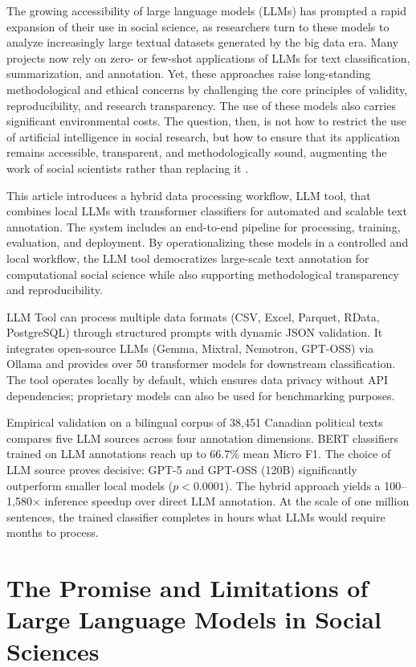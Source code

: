 \documentclass[12pt]{article}
\begin{document}
The growing accessibility of large language models (LLMs) has prompted a rapid expansion of their use in social science, as researchers turn to these models to analyze increasingly large textual datasets generated by the big data era. Many projects now rely on zero- or few-shot applications of LLMs for text classification, summarization, and annotation. Yet, these approaches raise long-standing methodological and ethical concerns by challenging the core principles of validity, reproducibility, and research transparency. The use of these models also carries significant environmental costs. The question, then, is not how to restrict the use of artificial intelligence in social research, but how to ensure that its application remains accessible, transparent, and methodologically sound, augmenting the work of social scientists rather than replacing it \parencite{grimmer_stewart13, do_etal24}.

This article introduces a hybrid data processing workflow, LLM tool, that combines local LLMs with transformer classifiers for automated and scalable text annotation. The system includes an end-to-end pipeline for processing, training, evaluation, and deployment. By operationalizing these models in a controlled and local workflow, the LLM tool democratizes large-scale text annotation for computational social science while also supporting methodological transparency and reproducibility.

LLM Tool can process multiple data formats (CSV, Excel, Parquet, RData, PostgreSQL) through structured prompts with dynamic JSON validation. It integrates open-source LLMs (Gemma, Mixtral, Nemotron, GPT-OSS) via Ollama and provides over 50 transformer models for downstream classification. The tool operates locally by default, which ensures data privacy without API dependencies; proprietary models can also be used for benchmarking purposes.

Empirical validation on a bilingual corpus of 38,451 Canadian political texts compares five LLM sources across four annotation dimensions. BERT classifiers trained on LLM annotations reach up to 66.7\% mean Micro F1. The choice of LLM source proves decisive: GPT-5 and GPT-OSS (120B) significantly outperform smaller local models ($p < 0.0001$). The hybrid approach yields a 100--1,580$\times$ inference speedup over direct LLM annotation. At the scale of one million sentences, the trained classifier completes in hours what LLMs would require months to process.

\section{The Promise and Limitations of Large Language Models in Social Sciences}
\end{document}
